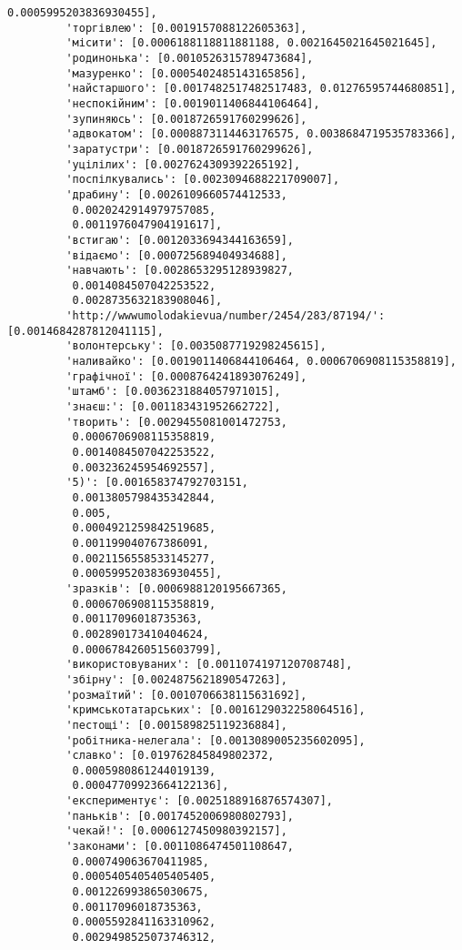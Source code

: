 \documentclass[11pt]{article}
\begin{document}
\begin{Verbatim}[commandchars=\\\{\}]
          0.0005995203836930455],
         'торгівлею': [0.0019157088122605363],
         'місити': [0.0006188118811881188, 0.0021645021645021645],
         'родинонька': [0.0010526315789473684],
         'мазуренко': [0.0005402485143165856],
         'найстаршого': [0.0017482517482517483, 0.01276595744680851],
         'неспокійним': [0.0019011406844106464],
         'зупиняюсь': [0.0018726591760299626],
         'адвокатом': [0.0008873114463176575, 0.0038684719535783366],
         'заратустри': [0.0018726591760299626],
         'уцілілих': [0.0027624309392265192],
         'поспілкувались': [0.0023094688221709007],
         'драбину': [0.0026109660574412533,
          0.0020242914979757085,
          0.0011976047904191617],
         'встигаю': [0.0012033694344163659],
         'відаємо': [0.000725689404934688],
         'навчають': [0.0028653295128939827,
          0.0014084507042253522,
          0.0028735632183908046],
         'http://wwwumolodakievua/number/2454/283/87194/': [0.0014684287812041115],
         'волонтерську': [0.0035087719298245615],
         'наливайко': [0.0019011406844106464, 0.0006706908115358819],
         'графічної': [0.0008764241893076249],
         'штамб': [0.0036231884057971015],
         'знаєш:': [0.001183431952662722],
         'творить': [0.0029455081001472753,
          0.0006706908115358819,
          0.0014084507042253522,
          0.003236245954692557],
         '5)': [0.001658374792703151,
          0.0013805798435342844,
          0.005,
          0.0004921259842519685,
          0.001199040767386091,
          0.0021156558533145277,
          0.0005995203836930455],
         'зразків': [0.0006988120195667365,
          0.0006706908115358819,
          0.00117096018735363,
          0.002890173410404624,
          0.0006784260515603799],
         'використовуваних': [0.0011074197120708748],
         'збірну': [0.0024875621890547263],
         'розмаїтий': [0.0010706638115631692],
         'кримськотатарських': [0.0016129032258064516],
         'пестощі': [0.001589825119236884],
         'робітника-нелегала': [0.0013089005235602095],
         'славко': [0.019762845849802372,
          0.0005980861244019139,
          0.00047709923664122136],
         'експериментує': [0.0025188916876574307],
         'паньків': [0.0017452006980802793],
         'чекай!': [0.0006127450980392157],
         'законами': [0.0011086474501108647,
          0.000749063670411985,
          0.0005405405405405405,
          0.001226993865030675,
          0.00117096018735363,
          0.0005592841163310962,
          0.0029498525073746312,

\end{Verbatim}
\end{document}

